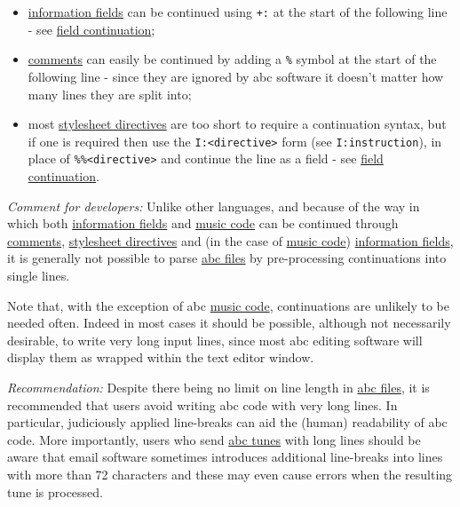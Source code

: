 \documentclass[oneside]{book}
\begin{document}
\begin{itemize}
\item
  \protect\hyperlink{information_field_definition}{information fields}
  can be continued using \texttt{+:} at the start of the following line
  - see \protect\hyperlink{field_continuation}{field continuation};
\item
  \protect\hyperlink{comment_definition}{comments} can easily be
  continued by adding a \texttt{\%} symbol at the start of the following
  line - since they are ignored by abc software it doesn't matter how
  many lines they are split into;
\item
  most \protect\hyperlink{stylesheet_directive_definition}{stylesheet
  directives} are too short to require a continuation syntax, but if one
  is required then use the \texttt{I:\textless{}directive\textgreater{}}
  form (see \texttt{I:instruction}), in place of
  \texttt{\%\%\textless{}directive\textgreater{}} and continue the line
  as a field - see \protect\hyperlink{field_continuation}{field
  continuation}.
\end{itemize}

\emph{Comment for developers:} Unlike other languages, and because of
the way in which both
\protect\hyperlink{information_field_definition}{information fields} and
\protect\hyperlink{music_code_definition}{music code} can be continued
through \protect\hyperlink{comment_definition}{comments},
\protect\hyperlink{stylesheet_directive_definition}{stylesheet
directives} and (in the case of
\protect\hyperlink{music_code_definition}{music code})
\protect\hyperlink{information_field_definition}{information fields}, it
is generally not possible to parse
\protect\hyperlink{abc_file_definition}{abc files} by pre-processing
continuations into single lines.

Note that, with the exception of abc
\protect\hyperlink{music_code_definition}{music code}, continuations are
unlikely to be needed often. Indeed in most cases it should be possible,
although not necessarily desirable, to write very long input lines,
since most abc editing software will display them as wrapped within the
text editor window.

\emph{Recommendation:} Despite there being no limit on line length in
\protect\hyperlink{abc_file_definition}{abc files}, it is recommended
that users avoid writing abc code with very long lines. In particular,
judiciously applied line-breaks can aid the (human) readability of abc
code. More importantly, users who send
\protect\hyperlink{abc_tune_definition}{abc tunes} with long lines
should be aware that email software sometimes introduces additional
line-breaks into lines with more than 72 characters and these may even
cause errors when the resulting tune is processed.
\end{document}
